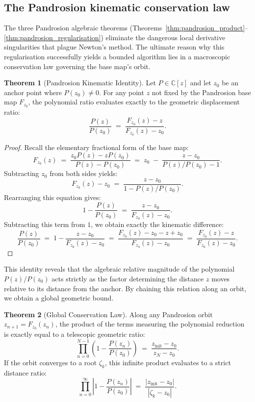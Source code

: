 \documentclass[11pt,a4paper]{article}
\theoremstyle{definition}
\newtheorem{theorem}{Theorem}[section]
\newcommand{\CC}{\mathbb{C}}
\begin{document}
\subsection{The Pandrosion kinematic conservation law}
\label{sec:kinematic_conservation}

The three Pandrosion algebraic theorems (Theorems~\ref{thm:pandrosion_product}--\ref{thm:pandrosion_regularisation}) eliminate the dangerous local derivative singularities that plague Newton's method. The ultimate reason why this regularisation successfully yields a bounded algorithm lies in a macroscopic conservation law governing the base map's orbit.

\begin{theorem}[Pandrosion Kinematic Identity]
\label{thm:kinematic_identity}
Let $P \in \CC[z]$ and let $z_0$ be an anchor point where $P(z_0) \neq 0$. For any point $z$ not fixed by the Pandrosion base map $F_{z_0}$, the polynomial ratio evaluates exactly to the geometric displacement ratio:
\[
  \frac{P(z)}{P(z_0)} \;=\; \frac{F_{z_0}(z) - z}{F_{z_0}(z) - z_0}.
\]
\end{theorem}

\begin{proof}
Recall the elementary fractional form of the base map:
\[
  F_{z_0}(z) \;=\; \frac{z_0 P(z) - z P(z_0)}{P(z) - P(z_0)} \;=\; z_0 \;-\; \frac{z - z_0}{P(z)/P(z_0) - 1}.
\]
Subtracting $z_0$ from both sides yields:
\[
  F_{z_0}(z) - z_0 \;=\; \frac{z - z_0}{1 - P(z)/P(z_0)}.
\]
Rearranging this equation gives:
\[
  1 - \frac{P(z)}{P(z_0)} \;=\; \frac{z - z_0}{F_{z_0}(z) - z_0}.
\]
Subtracting this term from $1$, we obtain exactly the kinematic difference:
\[
  \frac{P(z)}{P(z_0)} \;=\; 1 - \frac{z - z_0}{F_{z_0}(z) - z_0} \;=\; \frac{F_{z_0}(z) - z_0 - z + z_0}{F_{z_0}(z) - z_0} \;=\; \frac{F_{z_0}(z) - z}{F_{z_0}(z) - z_0}.
\]
\end{proof}

This identity reveals that the algebraic relative magnitude of the polynomial $P(z)/P(z_0)$ acts strictly as the factor determining the distance $z$ moves relative to its distance from the anchor. By chaining this relation along an orbit, we obtain a global geometric bound.

\begin{theorem}[Global Conservation Law]
\label{thm:global_conservation}
Along any Pandrosion orbit $z_{n+1} = F_{z_0}(z_n)$, the product of the terms measuring the polynomial reduction is exactly equal to a telescopic geometric ratio:
\[
  \prod_{n=0}^{N-1} \left( 1 - \frac{P(z_n)}{P(z_0)} \right) \;=\; \frac{z_{\mathrm{init}} - z_0}{z_N - z_0}.
\]
If the orbit converges to a root $\zeta_k$, this infinite product evaluates to a strict distance ratio:
\[
  \prod_{n=0}^{\infty} \left| 1 - \frac{P(z_n)}{P(z_0)} \right| \;=\; \frac{|z_{\mathrm{init}} - z_0|}{|\zeta_k - z_0|}.
\]
\end{theorem}
\end{document}
